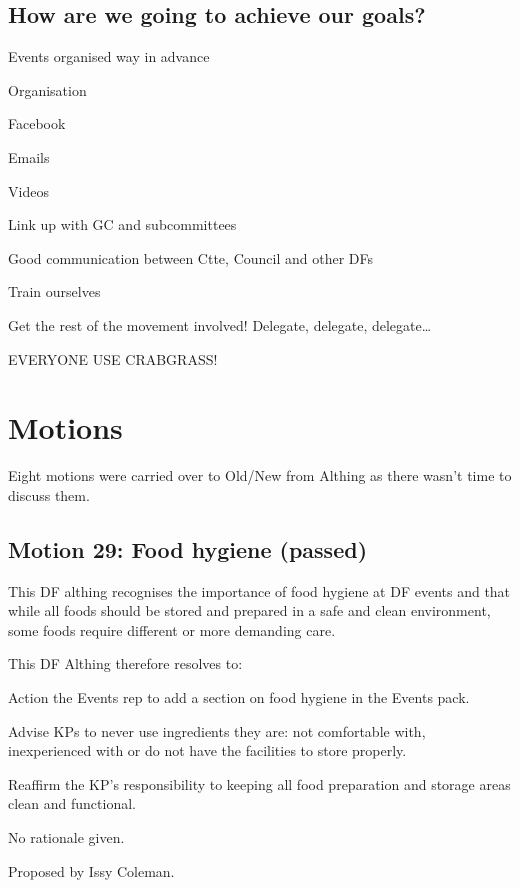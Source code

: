 \documentclass[a4paper, 12pt]{article}
\begin{document}
\subsection{How are we going to achieve our goals?}
\begin{itemize*}
	\item Events organised way in advance
	\item Organisation
	\item Facebook
	\item Emails
	\item Videos
	\item Link up with GC and subcommittees
	\item Good communication between Ctte, Council and other DFs
	\item Train ourselves
	\item Get the rest of the movement involved! Delegate, delegate, delegate\ldots
	\item EVERYONE USE CRABGRASS!
\end{itemize*}

\section{Motions}
Eight motions were carried over to Old/New from Althing as there wasn't time to discuss them.
\subsection{Motion 29: Food hygiene (passed)}
This DF althing recognises the importance of food hygiene at DF events and that while all foods should be stored and prepared in a safe and clean environment, some foods require different or more demanding care.

This DF Althing therefore resolves to:
\begin{itemize*}
	\item Action the Events rep to add a section on food hygiene in the Events pack.
	\item Advise KPs to never use ingredients they are: not comfortable with, inexperienced with or do not have the facilities to store properly.
	\item Reaffirm the KP's responsibility to keeping all food preparation and storage areas clean and functional.
\end{itemize*}

No rationale given.

Proposed by Issy Coleman.
\end{document}
